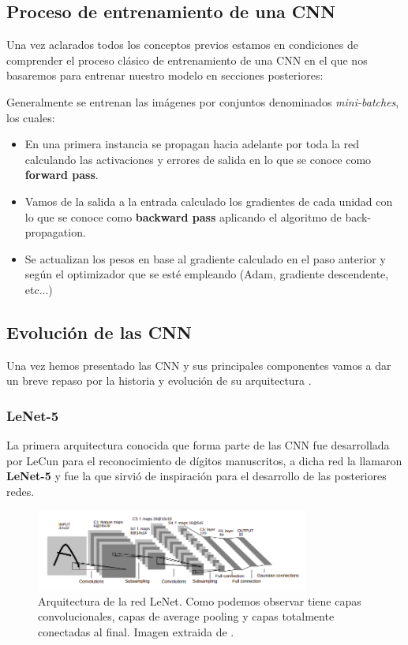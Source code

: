     \subsection{Proceso de entrenamiento de una CNN}

        \noindent Una vez aclarados todos los conceptos previos estamos en condiciones de comprender el proceso clásico de entrenamiento de una CNN en el que nos basaremos para entrenar nuestro modelo en secciones posteriores: 

        \medskip

        \noindent Generalmente se entrenan las imágenes por conjuntos denominados \textit{mini-batches}, los cuales: 

        \begin{itemize}
            \item En una primera instancia se propagan hacia adelante por toda la red calculando las activaciones y errores de salida en lo que se conoce como \textbf{forward pass}.
            \item Vamos de la salida a la entrada calculado los gradientes de cada unidad con lo que se conoce como \textbf{backward pass} aplicando el algoritmo de back-propagation.
            \item Se actualizan los pesos en base al gradiente calculado en el paso anterior y según el optimizador que se esté empleando (Adam, gradiente descendente, etc...)
        \end{itemize}

    \subsection{Evolución de las CNN}
    Una vez hemos presentado las CNN y sus principales componentes vamos a dar un breve repaso por la historia y evolución de su arquitectura \cite{EvolutionCNN}.

    \subsubsection{LeNet-5}
        \noindent La primera arquitectura conocida que forma parte de las CNN fue desarrollada por LeCun \cite{lecun1998gradient} para el reconocimiento de dígitos manuscritos, a dicha red la llamaron \textbf{LeNet-5} y fue la que sirvió de inspiración para el desarrollo de las posteriores redes.

        \begin{figure}[!h]
            \centering
            \includegraphics[width=0.8\textwidth]{img/LeNet.png}
            \caption{Arquitectura de la red LeNet. Como podemos observar tiene capas convolucionales, capas de average pooling y capas totalmente conectadas al final. Imagen extraida de \cite{lecun1998gradient}.}
            \label{fig:LeNet}
        \end{figure}

